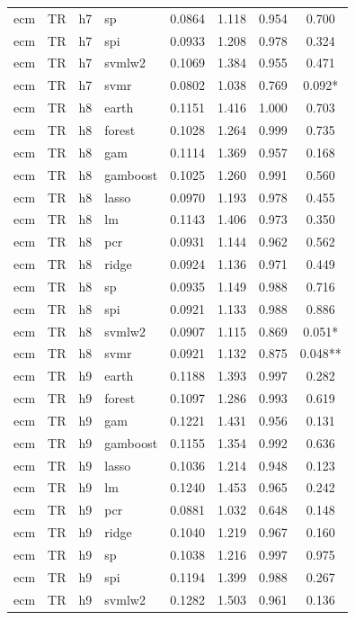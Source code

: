 \begin{ThreePartTable}
\begin{longtable}[t]{llclcccc}
ecm & TR & h7 & sp & 0.0864 & 1.118 & 0.954 & 0.700\\
ecm & TR & h7 & spi & 0.0933 & 1.208 & 0.978 & 0.324\\
ecm & TR & h7 & svmlw2 & 0.1069 & 1.384 & 0.955 & 0.471\\
ecm & TR & h7 & svmr & 0.0802 & 1.038 & 0.769 & 0.092*\\
\addlinespace
ecm & TR & h8 & earth & 0.1151 & 1.416 & 1.000 & 0.703\\
ecm & TR & h8 & forest & 0.1028 & 1.264 & 0.999 & 0.735\\
ecm & TR & h8 & gam & 0.1114 & 1.369 & 0.957 & 0.168\\
ecm & TR & h8 & gamboost & 0.1025 & 1.260 & 0.991 & 0.560\\
ecm & TR & h8 & lasso & 0.0970 & 1.193 & 0.978 & 0.455\\
ecm & TR & h8 & lm & 0.1143 & 1.406 & 0.973 & 0.350\\
ecm & TR & h8 & pcr & 0.0931 & 1.144 & 0.962 & 0.562\\
ecm & TR & h8 & ridge & 0.0924 & 1.136 & 0.971 & 0.449\\
ecm & TR & h8 & sp & 0.0935 & 1.149 & 0.988 & 0.716\\
ecm & TR & h8 & spi & 0.0921 & 1.133 & 0.988 & 0.886\\
ecm & TR & h8 & svmlw2 & 0.0907 & 1.115 & 0.869 & 0.051*\\
ecm & TR & h8 & svmr & 0.0921 & 1.132 & 0.875 & 0.048**\\
\addlinespace
ecm & TR & h9 & earth & 0.1188 & 1.393 & 0.997 & 0.282\\
ecm & TR & h9 & forest & 0.1097 & 1.286 & 0.993 & 0.619\\
ecm & TR & h9 & gam & 0.1221 & 1.431 & 0.956 & 0.131\\
ecm & TR & h9 & gamboost & 0.1155 & 1.354 & 0.992 & 0.636\\
ecm & TR & h9 & lasso & 0.1036 & 1.214 & 0.948 & 0.123\\
ecm & TR & h9 & lm & 0.1240 & 1.453 & 0.965 & 0.242\\
ecm & TR & h9 & pcr & 0.0881 & 1.032 & 0.648 & 0.148\\
ecm & TR & h9 & ridge & 0.1040 & 1.219 & 0.967 & 0.160\\
ecm & TR & h9 & sp & 0.1038 & 1.216 & 0.997 & 0.975\\
ecm & TR & h9 & spi & 0.1194 & 1.399 & 0.988 & 0.267\\
ecm & TR & h9 & svmlw2 & 0.1282 & 1.503 & 0.961 & 0.136\\

\end{longtable}
\end{ThreePartTable}
